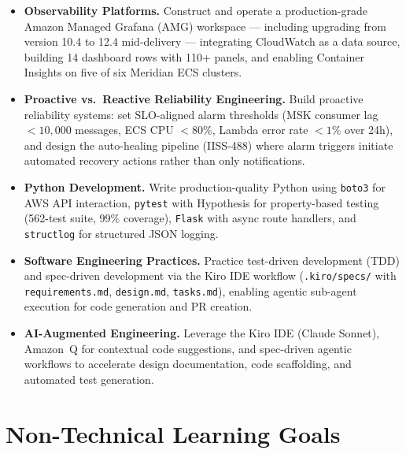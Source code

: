 \begin{itemize}
    \item \textbf{Observability Platforms.}
          Construct and operate a production-grade Amazon Managed Grafana
          (AMG) workspace --- including upgrading from version 10.4 to 12.4
          mid-delivery --- integrating CloudWatch as a data source, building
          14 dashboard rows with 110+ panels, and enabling Container
          Insights on five of six Meridian ECS clusters.

    \item \textbf{Proactive vs.\ Reactive Reliability Engineering.}
          Build proactive reliability systems: set SLO-aligned alarm
          thresholds (MSK consumer lag $< 10{,}000$ messages, ECS CPU
          $< 80\%$, Lambda error rate $< 1\%$ over 24h), and design the
          auto-healing pipeline (IISS-488) where alarm triggers initiate
          automated recovery actions rather than only notifications.

    \item \textbf{Python Development.}
          Write production-quality Python using \texttt{boto3} for AWS API
          interaction, \texttt{pytest} with Hypothesis for property-based
          testing (562-test suite, 99\% coverage), \texttt{Flask} with
          async route handlers, and \texttt{structlog} for structured JSON
          logging.

    \item \textbf{Software Engineering Practices.}
          Practice test-driven development (TDD) and spec-driven development
          via the Kiro IDE workflow (\texttt{.kiro/specs/} with
          \texttt{requirements.md}, \texttt{design.md}, \texttt{tasks.md}),
          enabling agentic sub-agent execution for code generation and PR
          creation.

    \item \textbf{AI-Augmented Engineering.}
          Leverage the Kiro IDE (Claude Sonnet), Amazon~Q for contextual
          code suggestions, and spec-driven agentic workflows to accelerate
          design documentation, code scaffolding, and automated test
          generation.
\end{itemize}

\section{Non-Technical Learning Goals}

